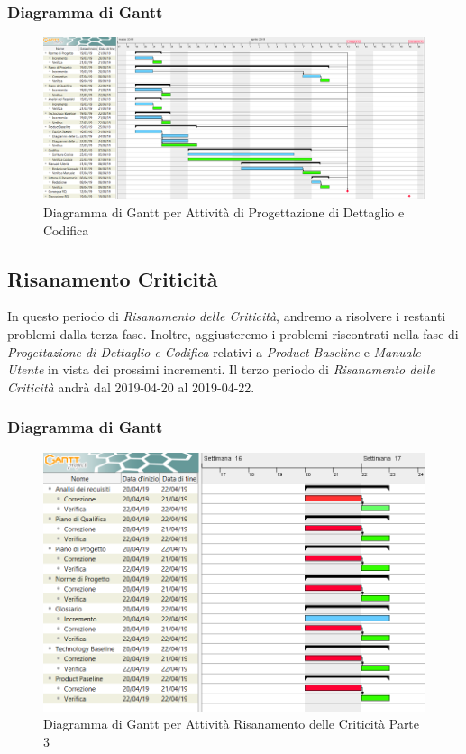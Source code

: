 \begin{landscape}
\subsubsection{Diagramma di Gantt}
\begin{figure}[h]
	\centering
  		\includegraphics[width=1.0\linewidth]{./images/DettaglioeCodifica.png}
  		\caption{Diagramma di Gantt per Attività di Progettazione di Dettaglio e Codifica}
  		\label{fig:Gantt Progettazione di dettaglio e codifica}
\end{figure}
\end{landscape}

\subsection{Risanamento Criticità}
\label{RC3}
In questo periodo di \textit{Risanamento delle Criticità}, andremo a risolvere i restanti problemi dalla terza fase. Inoltre, aggiusteremo i problemi riscontrati nella fase di \textit{Progettazione di Dettaglio e Codifica} relativi a \textit{Product Baseline} e \textit{Manuale Utente} in vista dei prossimi incrementi.
Il terzo periodo di \textit{Risanamento delle Criticità} andrà dal 2019-04-20 al 2019-04-22.

\subsubsection{Diagramma di Gantt}
\begin{figure}[h]
	\centering
  		\includegraphics[width=1.0\linewidth]{./images/RisanamentoCriticita3.png}
  		\caption{Diagramma di Gantt per Attività Risanamento delle Criticità Parte 3}
  		\label{fig:Gantt Risananmento Criticità 3}
\end{figure}

